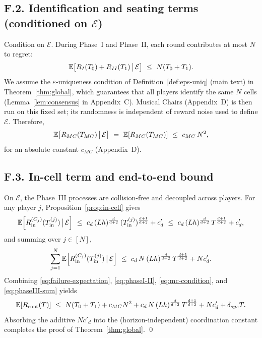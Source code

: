 \subsection*{F.2.\; Identification and seating terms (conditioned on $\mathcal E$)}

Condition on $\mathcal E$. During Phase~I and Phase~II, each round contributes at most $N$ to regret:
\begin{equation}
\label{eq:phaseI-II}
\EE\!\left[R_{I}(T_0)+R_{II}(T_1)\,\big|\,\mathcal E\right] \ \le\ N(T_0+T_1).
\end{equation}
We assume the $\varepsilon$-uniqueness condition of Definition~\ref{def:eps-uniq} (main text) in Theorem~\ref{thm:global}, which guarantees that all players identify the same $N$ cells (Lemma~\ref{lem:consensus} in Appendix~C).
Musical Chairs (Appendix~D) is then run on this fixed set; its randomness is independent of reward noise used to define $\mathcal E$.
Therefore,
\begin{equation}
\label{eq:mc-condition}
\mathbb{E}\!\left[R_{MC}(T_{MC})\,\big|\,\mathcal E\right]
\ =\ \mathbb{E}\!\left[R_{MC}(T_{MC})\right]
\ \le\ c_{MC}\,N^2,
\end{equation}
for an absolute constant $c_{MC}$ (Appendix~D).

\subsection*{F.3.\; In-cell term and end-to-end bound}

On $\mathcal E$, the Phase~III processes are collision-free and decoupled across players.
For any player $j$, Proposition~\ref{prop:in-cell} gives
\[
\EE\!\left[R_{\mathrm{in}}^{(C_j)}(T^{(j)}_{\mathrm{in}})\,\big|\,\mathcal E\right]
\ \le\ c_d\,(Lh)^{\frac{d}{d+2}}\,(T^{(j)}_{\mathrm{in}})^{\frac{d+1}{d+2}} + c'_d
\ \le\ c_d\,(Lh)^{\frac{d}{d+2}}\,T^{\frac{d+1}{d+2}} + c'_d,
\]
and summing over $j\in[N]$,
\begin{equation}
\label{eq:phaseIII-sum}
\sum_{j=1}^N \mathbb{E}\!\left[R_{\mathrm{in}}^{(C_j)}(T^{(j)}_{\mathrm{in}})\,\big|\,\mathcal E\right]
\ \le\ c_d\,N\,(Lh)^{\frac{d}{d+2}}\,T^{\frac{d+1}{d+2}} + N c'_d.
\end{equation}
Combining \eqref{eq:failure-expectation}, \eqref{eq:phaseI-II}, \eqref{eq:mc-condition}, and \eqref{eq:phaseIII-sum} yields
\[
\mathbb{E}[R_{\mathrm{cont}}(T)]
\ \le\ N(T_0+T_1) + c_{MC}N^2 + c_d\,N\,(Lh)^{\frac{d}{d+2}}\,T^{\frac{d+1}{d+2}} + N c'_d + \delta_{sys} T.
\]
Absorbing the additive $Nc'_d$ into the (horizon-independent) coordination constant completes the proof of Theorem~\ref{thm:global}.
\qed

